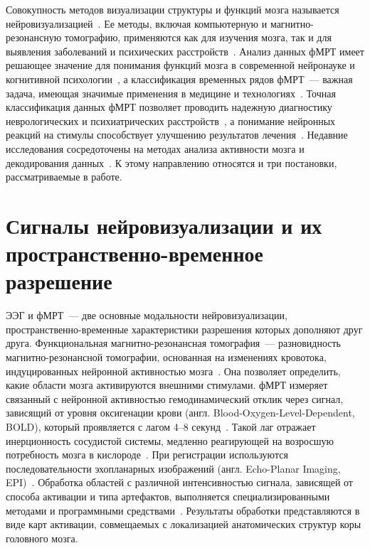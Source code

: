 Совокупность методов визуализации структуры и функций мозга называется нейровизуализацией~\cite{puras2014neurovisualization}. Ее методы, включая компьютерную и магнитно-резонансную томографию, применяются как для изучения мозга, так и для выявления заболеваний и психических расстройств~\cite{zhu2024jointly, sudha2024dynamically, tigga2022efficacy}. Анализ данных фМРТ имеет решающее значение для понимания функций мозга в современной нейронауке и когнитивной психологии~\cite{logothetis2008we, bandettini2012twenty}, а классификация временных рядов фМРТ~--- важная задача, имеющая значимые применения в медицине и технологиях~\cite{ahmadi2020multiclass, dai2023classification, tang2023multi}. Точная классификация данных фМРТ позволяет проводить надежную диагностику неврологических и психиатрических расстройств~\cite{yin2022deep, lima2022comprehensive, chawla2025early, yuan2025intermediary}, а понимание нейронных реакций на стимулы способствует улучшению результатов лечения~\cite{warren2024assistive}. Недавние исследования сосредоточены на методах анализа активности мозга и декодирования данных~\cite{HUANG2024102573, yuan2021bci, du2022fmri}. К этому направлению относятся и три постановки, рассматриваемые в работе.

\section{Сигналы нейровизуализации и их пространственно-временное разрешение}\label{sec1:modalities}

ЭЭГ и фМРТ~--- две основные модальности нейровизуализации, пространственно-временные характеристики разрешения которых дополняют друг друга. Функциональная магнитно-резонансная томография~--- разновидность магнитно-резонансной томографии, основанная на изменениях кровотока, индуцированных нейронной активностью мозга~\cite{Glover2011}. Она позволяет определить, какие области мозга активируются внешними стимулами. фМРТ измеряет связанный с нейронной активностью гемодинамический отклик через сигнал, зависящий от уровня оксигенации крови (англ. Blood-Oxygen-Level-Dependent, BOLD), который проявляется с лагом 4--8 секунд~\cite{Bandettini1992}. Такой лаг отражает инерционность сосудистой системы, медленно реагирующей на возросшую потребность мозга в кислороде~\cite{Ogawa1990, LEBIHAN1995231, Logothetis2003}. При регистрации используются последовательности эхопланарных изображений (англ. Echo-Planar Imaging, EPI)~\cite{Connelly1993, Kwong1992, Ogawa1992}. Обработка областей с различной интенсивностью сигнала, зависящей от способа активации и типа артефактов, выполняется специализированными методами и программными средствами~\cite{Bandettini1992, BAUDENDISTEL1995701, COX1996162}. Результаты обработки представляются в виде карт активации, совмещаемых с локализацией анатомических структур коры головного мозга.

